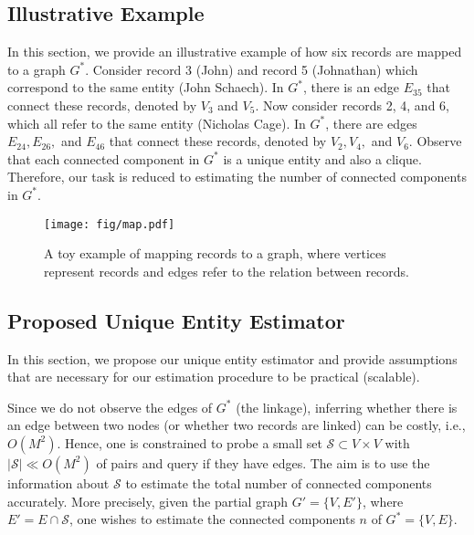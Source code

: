 \documentclass{imsart}
\begin{document}
\subsection{Illustrative Example}
\label{sec:toy}

In this section, we provide an illustrative example of how six records are mapped to a graph $G^*$.
%
Consider record 3 (John) and record 5 (Johnathan) which correspond to the same entity (John Schaech). In $G^*$, there is an edge $E_{35}$ that connect these records, denoted by $V_3$ and $V_5.$
%
Now consider records 2, 4, and 6, which all refer to the same entity (Nicholas Cage). In $G^*$, there are edges $E_{24}, E_{26},$ and $E_{46}$  that connect these records, denoted by $V_2, V_4,$ and $V_6.$
%
Observe that each connected component in $G^*$ is a unique entity and also a clique. Therefore, our task is reduced to estimating the number of connected components in $G^*$.

\begin{figure}[ht]
	\begin{center}
		\texttt{[image: fig/map.pdf]}
		\caption{A toy example of mapping records to a graph, where vertices represent records and edges refer to the relation between records.}
		\label{map}
	\end{center}
	\vskip -0.2in
\end{figure}


\subsection{Proposed Unique Entity Estimator}
\label{analysis}
In this section, we propose our unique entity estimator and provide assumptions that are necessary for our estimation procedure to be practical (scalable).

Since we do not observe the edges of $G^*$ (the linkage), inferring whether there is an edge between two nodes (or whether two records are linked) can be costly, i.e., $O(M^2)$. Hence, one is constrained to probe a small set $\mathcal{S} \subset V \times V$ with $|\mathcal{S}|\ll O(M^2)$ of pairs and query if they have edges. The aim is to use the information about $\mathcal{S}$ to estimate the total number of connected components accurately. More precisely,  given the partial graph $G' = \{V,E'\}$, where $E' = E \cap \mathcal{S}$, one wishes to estimate the connected components $n$ of $G^* = \{V,E\}.$
\end{document}
